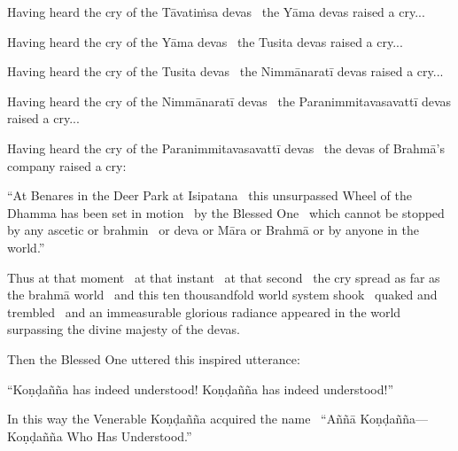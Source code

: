 \begin{english-only-hang}
  Having heard the cry of the Tāvatiṁsa devas \breathmark\ the Yāma devas raised a cry...
\end{english-only-hang}

\begin{english-only-hang}
  Having heard the cry of the Yāma devas \breathmark\ the Tusita devas raised a cry...
\end{english-only-hang}

\begin{english-only-hang}
  Having heard the cry of the Tusita devas \breathmark\ the Nimmānaratī devas raised a cry...
\end{english-only-hang}

\begin{english-only-hang}
  Having heard the cry of the Nimmānaratī devas \breathmark\ the Paranimmitavasavattī devas raised a cry...
\end{english-only-hang}

\begin{english-only-hang}
  Having heard the cry of the Paranimmitavasavattī devas \breathmark\ the devas of Brahmā's company raised a cry:
\end{english-only-hang}

\begin{english-only-hang}
  ``At Benares in the Deer Park at Isipatana \breathmark\ this unsurpassed Wheel of the Dhamma has been set in motion \breathmark\ by the Blessed One \breathmark\ which cannot be stopped by any ascetic or brahmin \breathmark\ or deva or Māra or Brahmā or by anyone in the world.''
\end{english-only-hang}

\begin{english-only-hang}
  Thus at that moment \breathmark\ at that instant \breathmark\ at that second \breathmark\ the cry spread as far as the brahmā world \breathmark\ and this ten thousandfold world system shook \breathmark\ quaked and trembled \breathmark\ and an immeasurable glorious radiance appeared in the world surpassing the divine majesty of the devas.
\end{english-only-hang}

\begin{english-only-hang}
  Then the Blessed One uttered this inspired utterance:
\end{english-only-hang}

\begin{english-only-hang}
  ``Koṇḍañña has indeed understood! Koṇḍañña has indeed understood!''
\end{english-only-hang}

\begin{english-only-hang}
  In this way the Venerable Koṇḍañña acquired the name \breathmark\ ``Aññā Koṇḍañña—Koṇḍañña Who Has Understood.''
\end{english-only-hang}

\suttaRef{[SN 56.11]}
